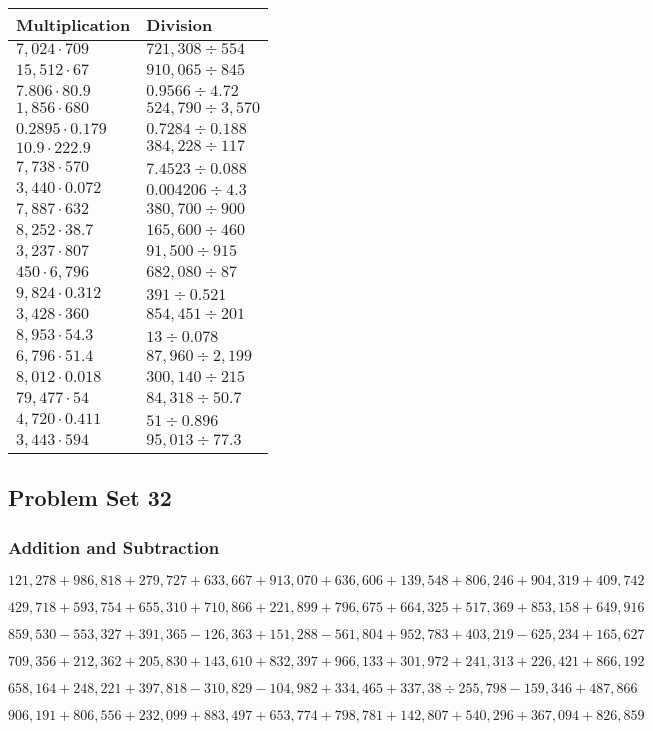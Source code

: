 \begin{longtable}[]{@{}ll@{}}
\toprule
Multiplication & Division\tabularnewline
\midrule
\endhead
\(7,024\cdot709\) & \(721,308÷554\)\tabularnewline
\(15,512\cdot67\) & \(910,065÷845\)\tabularnewline
\(7.806\cdot80.9\) & \(0.9566÷4.72\)\tabularnewline
\(1,856\cdot680\) & \(524,790÷3,570\)\tabularnewline
\(0.2895\cdot0.179\) & \(0.7284÷0.188\)\tabularnewline
\(10.9\cdot222.9\) & \(384,228 ÷117\)\tabularnewline
\(7,738\cdot570\) & \(7.4523÷0.088\)\tabularnewline
\(3,440\cdot0.072\) & \(0.004206÷4.3\)\tabularnewline
\(7,887\cdot632\) & \(380,700÷900\)\tabularnewline
\(8,252\cdot38.7\) & \(165,600÷460\)\tabularnewline
\(3,237\cdot807\) & \(91,500÷915\)\tabularnewline
\(450\cdot6,796\) & \(682,080÷87\)\tabularnewline
\(9,824\cdot0.312\) & \(391÷0.521\)\tabularnewline
\(3,428\cdot360\) & \(854,451÷201\)\tabularnewline
\(8,953\cdot54.3\) & \(13÷0.078\)\tabularnewline
\(6,796\cdot51.4\) & \(87,960÷2,199\)\tabularnewline
\(8,012\cdot0.018\) & \(300,140÷215\)\tabularnewline
\(79,477\cdot54\) & \(84,318÷50.7\)\tabularnewline
\(4,720\cdot0.411\) & \(51÷0.896\)\tabularnewline
\(3,443\cdot594\) & \(95,013÷77.3\)\tabularnewline
\bottomrule
\end{longtable}

\hypertarget{problem-set-32-5}{%
\subsection{Problem Set 32}\label{problem-set-32-5}}

\hypertarget{addition-and-subtraction-337}{%
\subsubsection{Addition and
Subtraction}\label{addition-and-subtraction-337}}

\(121,278+986,818+279,727+633,667+913,070+636,606+139,548+806,246+904,319+ 409,742\)

\(429,718+593,754+655,310+710,866+221,899+796,675+664,325+517,369+853,158+649,916\)

\(859,530-553,327+391,365-126,363+151,288-561,804+952,783+403,219-625,234+165,627\)

\(709,356+212,362+205,830+143,610+832,397+966,133+301,972+241,313+226,421+866,192\)

\(658,164+248,221+397,818-310,829-104,982+334,465+337,38÷255,798-159,346+487,866\)

\(906,191+806,556+232,099+883,497+653,774+798,781+142,807+540,296+367,094+826,859\)


